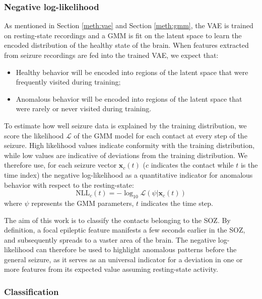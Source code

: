 \subsubsection{Negative log-likelihood}    \label{meth:neg_ll}

As mentioned in Section \ref{meth:vae} and Section \ref{meth:gmm},
the VAE is trained on resting-state recordings and a GMM is fit on the latent
space to learn the encoded distribution of the healthy state of the brain.
When features extracted from seizure recordings are fed into the trained VAE,
we expect that:
\begin{itemize}
    \item Healthy behavior will be encoded into regions of the latent space that
    were frequently visited during training;
    \item Anomalous behavior will be encoded into regions of the latent space
    that were rarely or never visited during training.
\end{itemize}

To estimate how well seizure data is explained by the training distribution,
we score the likelihood $\mathcal{L}$ of the GMM model for each contact at every
step of the seizure.
High likelihood values indicate conformity with the training distribution, while
low values are indicative of deviations from the training distribution.
We therefore use, for each seizure vector $\mathbf{x}_c(t)$ ($c$ indicates the
contact while $t$ is the time index)
the negative log-likelihood as a quantitative indicator for anomalous behavior
with respect to the resting-state:
\begin{equation}
    \text{NLL}_c(t) = -\log_{10}\mathcal{L}\left(\psi|\mathbf{x}_c(t)\right)    
\end{equation}
where $\psi$ represents the GMM parameters, $t$ indicates the time step.

The aim of this work is to classify the contacts belonging to the SOZ.
By definition, a focal epileptic feature manifests a few seconds earlier in the
SOZ, and subsequently spreads to a vaster area of the brain.
The negative log-likelihood can therefore be used to highlight anomalous 
patterns before the general seizure, as
it serves as an universal indicator for a deviation in one or more features from
its expected value assuming resting-state activity.

\subsubsection{Classification}         \label{meth:classifier}

